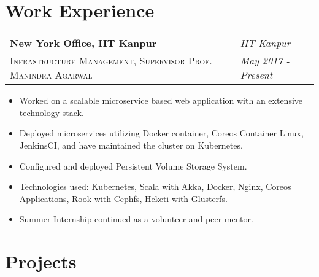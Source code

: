 \documentclass[11pt]{article}
\let\bold\textbf
\let\ital\textit
\let\smca\textsc
\begin{document}
\section*{{\selectfont Wor}k Experience\color{gray}\hrulefill}

\begin{tabu} to \textwidth {l X[r]}
  \bold{New York Office, IIT Kanpur} & {\scriptsize{}\selectfont\ital{IIT Kanpur}} \\
  {\footnotesize\color{lightgrey}\smca{Infrastructure Management, Supervisor Prof. Manindra Agarwal}} & {\scriptsize{}\selectfont\ital{May 2017 - Present}} 
\end{tabu}
{\footnotesize{}\selectfont\begin{itemize} %
        \item {Worked on a scalable microservice based web application with an extensive technology stack.}
        \item {Deployed microservices utilizing Docker container, Coreos Container Linux, JenkinsCI, and have maintained the cluster on Kubernetes.}
        \item {Configured and deployed Persistent Volume Storage System.}
        \item {Technologies used: Kubernetes, Scala with Akka, Docker, Nginx, Coreos Applications, Rook with Cephfs, Heketi with Glusterfs.}
        \item {Summer Internship continued as a volunteer and peer mentor.}
\end{itemize}}

\section*{{\selectfont Pro}jects\color{gray}\hrulefill}
\end{document}
